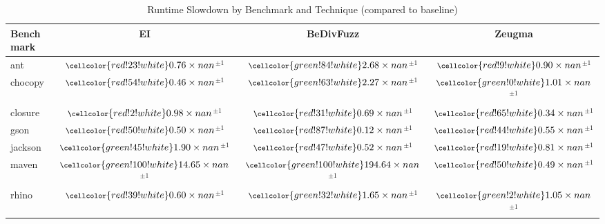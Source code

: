 \begin{table}[t]
\centering
\scriptsize
\caption{Runtime Slowdown by Benchmark and Technique (compared to baseline)}
\begin{tabular}{l|ccc}
\toprule
\textbf{Benchmark} & \textbf{EI} & \textbf{BeDivFuzz} & \textbf{Zeugma} \\
\midrule
ant & $\footnotesize\cellcolor{red!23!white}0.76\times nan$$^{\pm 1}$ & $\footnotesize\cellcolor{green!84!white}2.68\times nan$$^{\pm 1}$ & $\footnotesize\cellcolor{red!9!white}0.90\times nan$$^{\pm 1}$ \\
chocopy & $\footnotesize\cellcolor{red!54!white}0.46\times nan$$^{\pm 1}$ & $\footnotesize\cellcolor{green!63!white}2.27\times nan$$^{\pm 1}$ & $\footnotesize\cellcolor{green!0!white}1.01\times nan$$^{\pm 1}$ \\
closure & $\footnotesize\cellcolor{red!2!white}0.98\times nan$$^{\pm 1}$ & $\footnotesize\cellcolor{red!31!white}0.69\times nan$$^{\pm 1}$ & $\footnotesize\cellcolor{red!65!white}0.34\times nan$$^{\pm 1}$ \\
gson & $\footnotesize\cellcolor{red!50!white}0.50\times nan$$^{\pm 1}$ & $\footnotesize\cellcolor{red!87!white}0.12\times nan$$^{\pm 1}$ & $\footnotesize\cellcolor{red!44!white}0.55\times nan$$^{\pm 1}$ \\
jackson & $\footnotesize\cellcolor{green!45!white}1.90\times nan$$^{\pm 1}$ & $\footnotesize\cellcolor{red!47!white}0.52\times nan$$^{\pm 1}$ & $\footnotesize\cellcolor{red!19!white}0.81\times nan$$^{\pm 1}$ \\
maven & $\footnotesize\cellcolor{green!100!white}14.65\times nan$$^{\pm 1}$ & $\footnotesize\cellcolor{green!100!white}194.64\times nan$$^{\pm 1}$ & $\footnotesize\cellcolor{red!50!white}0.49\times nan$$^{\pm 1}$ \\
rhino & $\footnotesize\cellcolor{red!39!white}0.60\times nan$$^{\pm 1}$ & $\footnotesize\cellcolor{green!32!white}1.65\times nan$$^{\pm 1}$ & $\footnotesize\cellcolor{green!2!white}1.05\times nan$$^{\pm 1}$ \\
\bottomrule
\end{tabular}
\label{tab:runtime_slowdown}
\end{table}